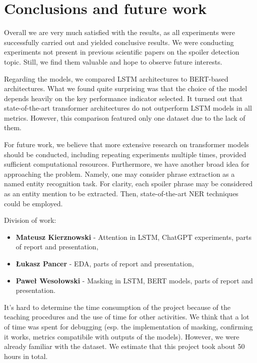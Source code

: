 \documentclass[11pt]{article}
\begin{document}
\section{Conclusions and future work} \label{conclusions}


Overall we are very much satisfied with the results, as all experiments were successfully carried out and yielded conclusive results. We were conducting experiments not present in previous scientific papers on the spoiler detection topic. Still, we find them valuable and hope to observe future interests.

Regarding the models, we compared LSTM architectures to BERT-based architectures. What we found quite surprising was that the choice of the model depends heavily on the key performance indicator selected. It turned out that state-of-the-art transformer architectures do not outperform LSTM models in all metrics. However, this comparison featured only one dataset due to the lack of them.

For future work, we believe that more extensive research on transformer models should be conducted, including repeating experiments multiple times, provided sufficient computational resources. Furthermore, we have another broad idea for approaching the problem. Namely, one may consider phrase extraction as a named entity recognition task. For clarity, each spoiler phrase may be considered as an entity mention to be extracted. Then, state-of-the-art NER techniques could be employed.


Division of work:
\begin{itemize}
    \item \textbf{Mateusz Kierznowski} - Attention in LSTM, ChatGPT experiments, parts of report and presentation,
    \item \textbf{Łukasz Pancer} - EDA, parts of report and presentation,
    \item \textbf{Paweł Wesołowski} - Masking in LSTM, BERT models, parts of report and presentation.
\end{itemize}
It's hard to determine the time consumption of the project because of the teaching procedures and the use of time for other activities. We think that a lot of time was spent for debugging (esp. the implementation of masking, confirming it works, metrics compatibile with outputs of the models). However, we were already familiar with the dataset. We estimate that this project took about 50 hours in total.




\end{document}
